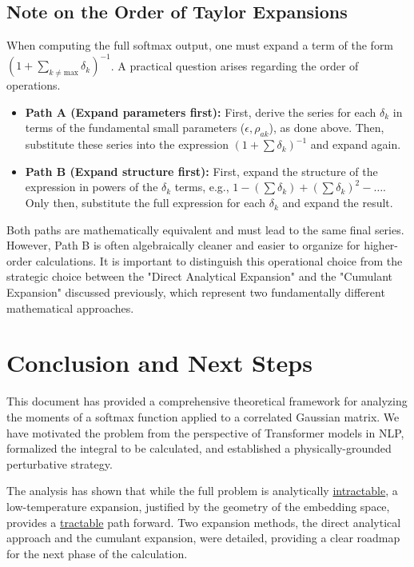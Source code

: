 \documentclass[12pt]{article}
\begin{document}
\subsection{Note on the Order of Taylor Expansions}
When computing the full softmax output, one must expand a term of the form $(1 + \sum_{k \neq \text{max}} \delta_k)^{-1}$. A practical question arises regarding the order of operations.
\begin{itemize}
    \item \textbf{Path A (Expand parameters first):} First, derive the series for each $\delta_k$ in terms of the fundamental small parameters ($\epsilon, \rho_{ak}$), as done above. Then, substitute these series into the expression $(1 + \sum \delta_k)^{-1}$ and expand again.
    \item \textbf{Path B (Expand structure first):} First, expand the structure of the expression in powers of the $\delta_k$ terms, e.g., $1 - (\sum \delta_k) + (\sum \delta_k)^2 - \dots$. Only then, substitute the full expression for each $\delta_k$ and expand the result.
\end{itemize}
Both paths are mathematically equivalent and must lead to the same final series. However, Path B is often algebraically cleaner and easier to organize for higher-order calculations. It is important to distinguish this operational choice from the strategic choice between the "Direct Analytical Expansion" and the "Cumulant Expansion" discussed previously, which represent two fundamentally different mathematical approaches.

\section{Conclusion and Next Steps}

This document has provided a comprehensive theoretical framework for analyzing the moments of a softmax function applied to a correlated Gaussian matrix. We have motivated the problem from the perspective of Transformer models in NLP, formalized the integral to be calculated, and established a physically-grounded perturbative strategy.

The analysis has shown that while the full problem is analytically \underline{intractable}, a low-temperature expansion, justified by the geometry of the embedding space, provides a \underline{tractable} path forward. Two expansion methods, the direct analytical approach and the cumulant expansion, were detailed, providing a clear roadmap for the next phase of the calculation.
\end{document}
